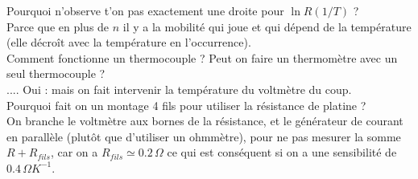 \documentclass[12pt,prb,aps,epsf]{report}
\begin{document}
Pourquoi n'observe t'on pas exactement une droite pour $\ln R(1/T)$ ?\\
Parce que en plus de $n$ il y a la mobilité qui joue et qui dépend de la température (elle décroît avec la température en l'occurrence).\\

Comment fonctionne un thermocouple ? Peut on faire un thermomètre avec un seul thermocouple ?\\
.... Oui : mais on fait intervenir la température du voltmètre du coup.\\

Pourquoi fait on un montage 4 fils pour utiliser la résistance de platine ?\\
On branche le voltmètre aux bornes de la résistance, et le générateur de courant en parallèle (plutôt que d'utiliser un ohmmètre), pour ne pas mesurer la somme $R+R_{fils}$, car on a $R_{fils} \simeq 0.2\, \Omega$ ce qui est conséquent si on a une sensibilité de $0.4\, \Omega K^{-1}$.\\
\end{document}
